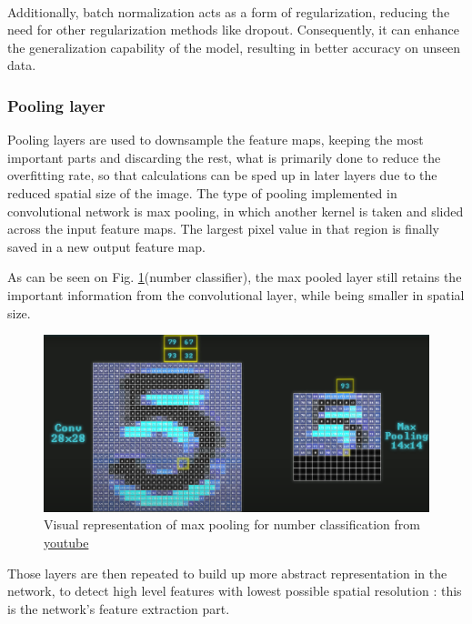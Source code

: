 \documentclass[twocolumn,superscriptaddress,aps]{revtex4-1}
\begin{document}
\\

 Additionally, batch normalization acts as a form of regularization, reducing the need for other regularization methods like dropout. Consequently, it can enhance the generalization capability of the model, resulting in better accuracy on unseen data.

\subsubsection{Pooling layer}

Pooling layers are used to downsample the feature maps, keeping the most important parts and discarding the rest, what is primarily done to reduce the overfitting rate, so that calculations can be sped up in later layers due to the reduced spatial size of the image. The type of pooling implemented in convolutional network is max pooling, in which another kernel is taken and slided across the input feature maps. The largest pixel value in that region is finally saved in a new output feature map.

As can be seen on Fig. \ref{fig:max_pool_visual}(number classifier), the max pooled layer still retains the important information from the convolutional layer, while being smaller in spatial size.

\begin{figure}[H]
    \centering
    \includegraphics[width=1\linewidth]{images/max_pool_visual.png}
    \caption{Visual representation of max pooling for number classification from \href{https://www.youtube.com/@OptimisticFuturology}{youtube}}
    \label{fig:max_pool_visual}
\end{figure}

Those layers are then repeated to build up more abstract representation in the network, to detect high level features with lowest possible spatial resolution : this is the network's feature extraction part.
\end{document}
